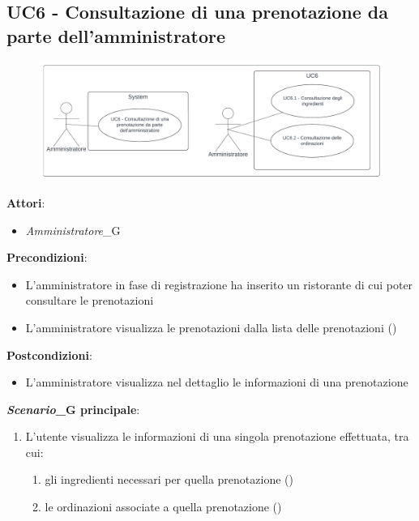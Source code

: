 \subsection{UC6 - Consultazione di una prenotazione da parte dell'amministratore}\label{usecase:6}
\begin{figure}[H]
  \centering
  \includegraphics[width=1\textwidth]{ucd/UCD6_new.png}
\end{figure}
\textbf{Attori}:
\begin{itemize}
    \item \textit{Amministratore}_G
\end{itemize}
\textbf{Precondizioni}:
\begin{itemize}
    \item L'amministratore in fase di registrazione ha inserito un ristorante di cui poter consultare le prenotazioni
    \item L'amministratore visualizza le prenotazioni dalla lista delle prenotazioni ()
\end{itemize}
\textbf{Postcondizioni}:
\begin{itemize}
    \item L'amministratore visualizza nel dettaglio le informazioni di una prenotazione
\end{itemize}
\textbf{\textit{Scenario}_G principale}:
\begin{enumerate}
    \item L'utente visualizza le informazioni di una singola prenotazione effettuata, tra cui:
    \begin{enumerate}
        \item gli ingredienti necessari per quella prenotazione ()
        \item le ordinazioni associate a quella prenotazione
        ()
    \end{enumerate}
\end{enumerate}